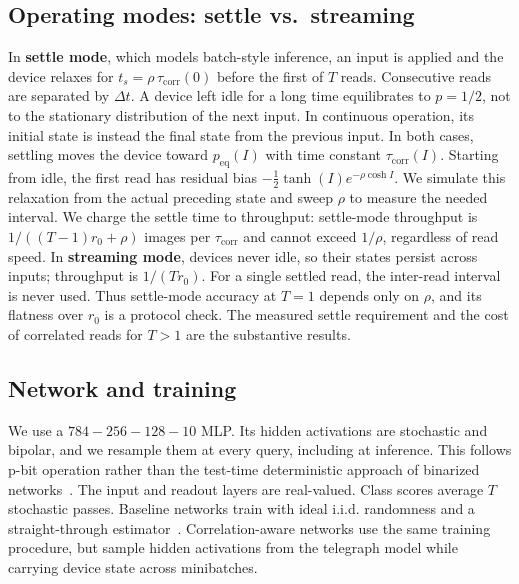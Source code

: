 \documentclass{ieeeaccess}
\newcommand{\rzero}{r_0}
\newcommand{\tauc}{\tau_{\mathrm{corr}}}
\begin{document}
\subsection{Operating modes: settle vs.\ streaming}
\label{sec:modes}
In \textbf{settle mode}, which models batch-style inference, an input is
applied and the device relaxes for $t_s=\rho\,\tauc(0)$ before the first of
$T$ reads. Consecutive reads are separated by $\Delta t$. A device left idle
for a long time equilibrates to $p=1/2$, not to the stationary distribution
of the next input. In continuous operation, its initial state is instead
the final state from the previous input. In both cases, settling moves the
device toward $p_{\mathrm{eq}}(I)$ with time constant $\tauc(I)$. Starting
from idle, the first read has residual bias
$-\tfrac{1}{2}\tanh(I)e^{-\rho\cosh I}$. We simulate this relaxation from
the actual preceding state and sweep $\rho$ to measure the needed interval.
We charge the settle time to throughput: settle-mode throughput is
$1/((T{-}1)\rzero+\rho)$ images per $\tauc$ and cannot exceed $1/\rho$,
regardless of read speed. In \textbf{streaming mode}, devices never idle,
so their states persist across inputs; throughput is $1/(T\rzero)$. For a
single settled read, the inter-read interval is never used. Thus
settle-mode accuracy at $T{=}1$ depends only on $\rho$, and its flatness
over $\rzero$ is a protocol check. The measured settle requirement and the
cost of correlated reads for $T{>}1$ are the substantive results.

\subsection{Network and training}
We use a $784{-}256{-}128{-}10$ MLP. Its hidden activations are stochastic
and bipolar, and we resample them at every query, including at inference.
This follows p-bit operation rather than the test-time deterministic approach
of binarized networks~\cite{courbariaux2015binaryconnect,hubara2016binarized}.
The input and readout layers are real-valued. Class scores average $T$
stochastic passes. Baseline networks train with ideal i.i.d. randomness and
a straight-through estimator~\cite{bengio2013estimating}. Correlation-aware
networks use the same training procedure, but sample hidden activations from
the telegraph model while carrying device state across minibatches.
\end{document}
